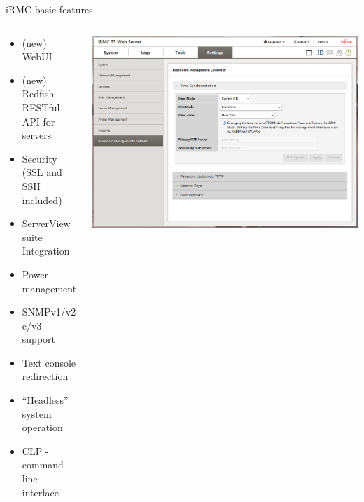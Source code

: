 \documentclass{beamer}
\begin{document}
  \begin{frame}{iRMC basic features}
	  \begin{columns}[onlytextwidth]
  		  \begin{column}{0.6\textwidth}
			  \begin{itemize}
				  \item (new) WebUI 
				  \item (new) Redfish - RESTful API for servers
				  \item Security (SSL and SSH included)
				  \item ServerView suite Integration
				  \item Power management
				  \item SNMPv1/v2c/v3 support
				  \item Text console redirection
				  \item “Headless” system operation
				  \item CLP - command line interface 
			  \end{itemize}
		  \end{column}

  		  \begin{column}{0.4\textwidth}
			  \includegraphics[width=\textwidth]{screenshot/webif-2.0.png}
		  \end{column}
	  \end{columns}

  \end{frame}
\end{document}
